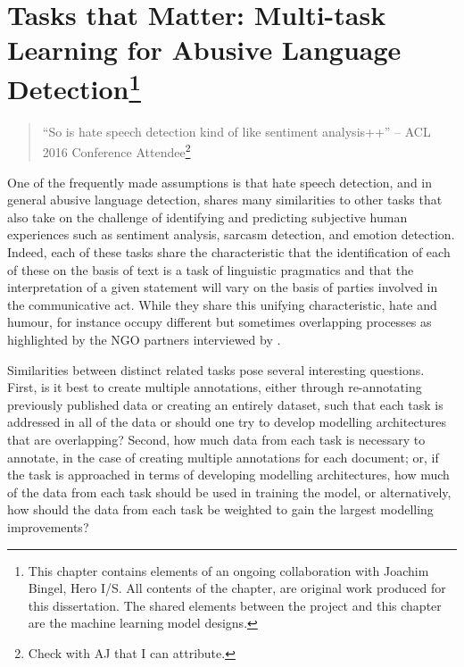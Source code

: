 \ifpdf
    \graphicspath{{Chapter5/Figs/Raster/}{Chapter5/Figs/PDF/}{Chapter5/Figs/}}
\else
    \graphicspath{{Chapter5/Figs/Vector/}{Chapter5/Figs/}}
\fi

\chapter[Tasks that Matter: Multi-task Learning for Abusive Language Detection]{Tasks that Matter: Multi-task Learning for Abusive Language Detection\footnote{This chapter contains elements of an ongoing collaboration with Joachim Bingel, Hero I/S. All contents of the chapter, are original work produced for this dissertation. The shared elements between the project and this chapter are the machine learning model designs.}}\label{chap:mtl}

\begin{quote}
  ``So is hate speech detection kind of like sentiment analysis++'' -- ACL 2016 Conference Attendee\footnote{Check with AJ that I can attribute.}
\end{quote}

One of the frequently made assumptions is that hate speech detection, and in general abusive language detection, shares many similarities to other tasks that also take on the challenge of identifying and predicting subjective human experiences such as sentiment analysis, sarcasm detection, and emotion detection.
Indeed, each of these tasks share the characteristic that the identification of each of these on the basis of text is a task of linguistic pragmatics and that the interpretation of a given statement will vary on the basis of parties involved in the communicative act.
While they share this unifying characteristic, hate and humour, for instance occupy different but sometimes overlapping processes as highlighted by the NGO partners interviewed by \citet{Rottger:2021}.

Similarities between distinct related tasks pose several interesting questions.
First, is it best to create multiple annotations, either through re-annotating previously published data or creating an entirely dataset, such that each task is addressed in all of the data or should one try to develop modelling architectures that are overlapping?
Second, how much data from each task is necessary to annotate, in the case of creating multiple annotations for each document; or, if the task is approached in terms of developing modelling architectures, how much of the data from each task should be used in training the model, or alternatively, how should the data from each task be weighted to gain the largest modelling improvements?


